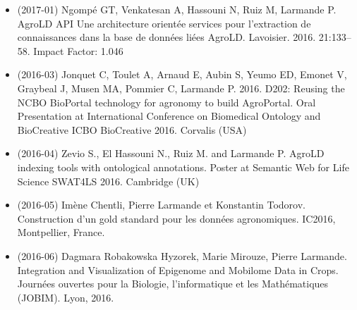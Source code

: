 \begin{itemize}
\item (2017-01) Ngompé GT, Venkatesan A, Hassouni N, Ruiz M, Larmande P. AgroLD API Une architecture orientée services pour l’extraction de connaissances dans la base de données liées AgroLD. Lavoisier. 2016. 21:133–58. Impact Factor: 1.046
\item (2016-03) Jonquet C, Toulet A, Arnaud E, Aubin S, Yeumo ED, Emonet V, Graybeal J, Musen MA, Pommier C, Larmande P.  2016.  D202: Reusing the NCBO BioPortal technology for agronomy to build AgroPortal. Oral Presentation at International Conference on Biomedical Ontology and BioCreative ICBO BioCreative 2016. Corvalis (USA)
\item (2016-04) Zevio S., El Hassouni N., Ruiz M. and Larmande P. AgroLD indexing tools with ontological annotations. Poster at Semantic Web for Life Science SWAT4LS 2016. Cambridge (UK)
\item (2016-05) Imène Chentli, Pierre Larmande et Konstantin Todorov. Construction d’un gold standard pour les données agronomiques. IC2016, Montpellier, France.
\item (2016-06) Dagmara Robakowska Hyzorek, Marie Mirouze, Pierre Larmande. Integration and Visualization of Epigenome and Mobilome Data in Crops. Journées ouvertes pour la Biologie, l’informatique et les Mathématiques (JOBIM). Lyon, 2016.
\end{itemize}


